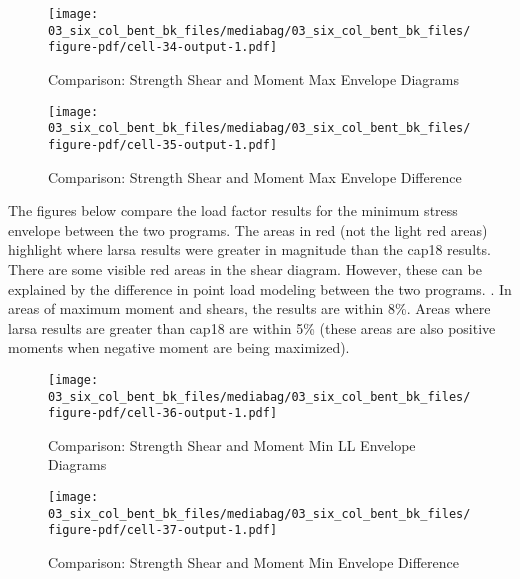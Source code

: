 \documentclass[
  letterpaper,
  DIV=11,
  numbers=noendperiod]{scrartcl}
\begin{document}
\begin{figure}[H]

{\centering \texttt{[image: 03\_six\_col\_bent\_bk\_files/mediabag/03\_six\_col\_bent\_bk\_files/figure-pdf/cell-34-output-1.pdf]}

}

\caption{Comparison: Strength Shear and Moment Max Envelope Diagrams}

\end{figure}%

\begin{figure}[H]

{\centering \texttt{[image: 03\_six\_col\_bent\_bk\_files/mediabag/03\_six\_col\_bent\_bk\_files/figure-pdf/cell-35-output-1.pdf]}

}

\caption{Comparison: Strength Shear and Moment Max Envelope Difference}

\end{figure}%

\newpage{}

The figures below compare the load factor results for the minimum stress
envelope between the two programs. The areas in red (not the light red
areas) highlight where larsa results were greater in magnitude than the
cap18 results. There are some visible red areas in the shear diagram.
However, these can be explained by the difference in point load modeling
between the two programs. . In areas of maximum moment and shears, the
results are within 8\%. Areas where larsa results are greater than cap18
are within 5\% (these areas are also positive moments when negative
moment are being maximized).

\begin{figure}[H]

{\centering \texttt{[image: 03\_six\_col\_bent\_bk\_files/mediabag/03\_six\_col\_bent\_bk\_files/figure-pdf/cell-36-output-1.pdf]}

}

\caption{Comparison: Strength Shear and Moment Min LL Envelope Diagrams}

\end{figure}%

\begin{figure}[H]

{\centering \texttt{[image: 03\_six\_col\_bent\_bk\_files/mediabag/03\_six\_col\_bent\_bk\_files/figure-pdf/cell-37-output-1.pdf]}

}

\caption{Comparison: Strength Shear and Moment Min Envelope Difference}

\end{figure}%
\end{document}
